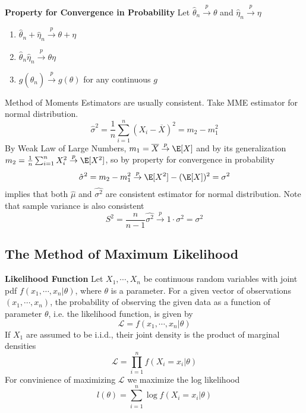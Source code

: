 \documentclass[11pt]{article}
\begin{document}
  \begin{theorem*}
    \textbf{Property for Convergence in Probability}
    Let $\hat{\theta}_n \stackrel{p}{\to} \theta$ and $\hat{\eta}_n \stackrel{p}{\to} \eta$
    \begin{enumerate}
      \item $\hat{\theta}_n + \hat{\eta}_n \stackrel{p}{\to} \theta + \eta$
      \item $\hat{\theta}_n \hat{\eta}_n \stackrel{p}{\to} \theta\eta$
      \item $g(\hat{\theta}_n)\stackrel{p}{\to} g(\theta)$ for any continuous $g$
    \end{enumerate}
    \begin{rem}
      Method of Moments Estimators are usually consistent. Take MME estimator for normal distribution.
      \[
        \hat{\sigma}^2 = \frac{1}{n}\sum_{i=1}^n (X_i - \overline{X})^2 = m_2 - m_1^2
      \]
      By Weak Law of Large Numbers, $m_1 = \overline{X} \stackrel{p}{\to} \E[X]$ and by its generalization $m_2 = \frac{1}{n}\sum_{i=1}^n X_i^2 \stackrel{p}{\to} \E[X^2]$, so by property for convergence in probability
      \[
        \hat{\sigma}^2 = m_2 - m_1^2 \stackrel{p}{\rightarrow} \E[X^2] - (\E[X])^2 = \sigma^2
      \]
      implies that both $\hat{\mu}$ and $\hat{\sigma^2}$ are consistent estimator for normal distribution. Note that sample variance is also consistent
      \[
        S^2 = \frac{n}{n-1} \hat{\sigma^2} \stackrel{p}{\to} 1 \cdot \sigma^2 = \sigma^2
      \]
    \end{rem}
  \end{theorem*}


\subsection*{The Method of Maximum Likelihood}


\begin{defn*}
  \textbf{Likelihood Function} Let $X_1, \cdots, X_n$ be continuous random variables with joint pdf $f(x_1, \cdots, x_n | \theta)$, where $\theta$ is a parameter. For a given vector of observations $(x_1, \cdots, x_n)$, the probability of observing the given data as a function of parameter $\theta$, i.e. the likelihood function, is given by
  \[
    \mathcal{L} = f(x_1, \cdots, x_n | \theta)
  \]
  If $X_1$ are assumed to be i.i.d., their joint density is the product of marginal densities
  \[
    \mathcal{L} = \prod_{i=1}^n f(X_i = x_i| \theta)
  \]
  For convinience of maximizing $\mathcal{L}$ we maximize the log likelihood
  \[
    l(\theta) = \sum_{i=1}^n \log f(X_i = x_i| \theta)
  \]
\end{defn*}
\end{document}
